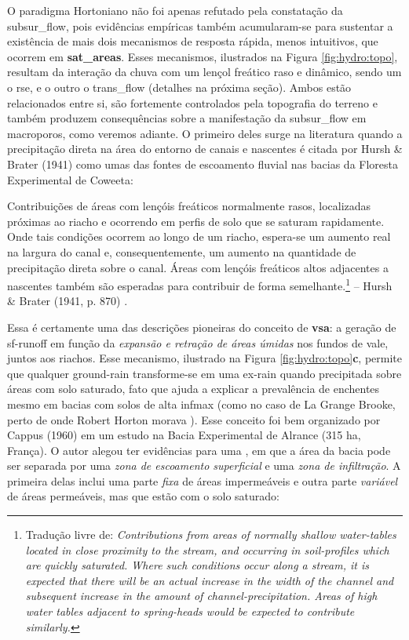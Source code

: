 \documentclass[./main.tex]{subfiles}
\begin{document}
\par O \gls{paradigma} Hortoniano não foi apenas refutado pela constatação da \gls{subsur_flow}, pois evidências empíricas também acumularam-se para sustentar a existência de mais dois mecanismos de resposta rápida, menos intuitivos, que ocorrem em \textbf{\gls{sat_areas}}. Esses mecanismos, ilustrados na Figura \ref{fig:hydro:topo}, resultam da interação da chuva com um lençol freático raso e dinâmico, sendo um o \gls{rse}, e o outro o \gls{trans_flow} (detalhes na próxima seção). Ambos estão relacionados entre si, são fortemente controlados pela topografia do terreno e também produzem consequências sobre a manifestação da \gls{subsur_flow} em macroporos, como veremos adiante. O primeiro deles surge na literatura quando a precipitação direta na área do entorno de canais e nascentes é citada por Hursh \& Brater (1941) \cite{Hursh1941} como umas das fontes de escoamento fluvial nas bacias da Floresta Experimental de Coweeta:   

\begin{adjustwidth}{100pt}{0pt}
\medskip
\small Contribuições de áreas com lençóis freáticos normalmente rasos, localizadas próximas ao riacho e ocorrendo em perfis de solo que se saturam rapidamente. Onde tais condições ocorrem ao longo de um riacho, espera-se um aumento real na largura do canal e, consequentemente, um aumento na quantidade de precipitação direta sobre o canal. Áreas com lençóis freáticos altos adjacentes a nascentes também são esperadas para contribuir de forma semelhante.\footnote{Tradução livre de: \textit{Contributions from areas of normally shallow water-tables located in close proximity to the stream, and occurring in soil-profiles which are quickly saturated. Where such conditions occur along a stream, it is expected that there will be an actual increase in the width of the channel and subsequent increase in the amount of channel-precipitation. Areas of high water tables adjacent to spring-heads would be expected to contribute similarly.}} -- Hursh \& Brater (1941, p. 870) \cite{Hursh1941}.
\medskip
\end{adjustwidth}

\noindent Essa é certamente uma das descrições pioneiras do conceito de \textbf{\gls{vsa}}: a geração de \gls{sf-runoff} em função da \textit{expansão e retração de áreas úmidas} nos fundos de vale, juntos aos riachos. Esse mecanismo, ilustrado na Figura \ref{fig:hydro:topo}\textbf{c}, permite que qualquer \gls{ground-rain} transforme-se em uma \gls{ex-rain} quando precipitada sobre áreas com solo saturado, fato que ajuda a explicar a prevalência de enchentes mesmo em bacias com solos de alta \gls{infmax} (como no caso de La Grange Brooke, perto de onde Robert Horton morava \cite{Beven2004c}). Esse conceito foi bem organizado por Cappus (1960) \cite{Cappus1960} em um estudo na Bacia Experimental de Alrance (315 ha, França). O autor alegou ter evidências para uma , em que a área da bacia pode ser separada por uma \textit{zona de escoamento superficial} e uma \textit{zona de infiltração}. A primeira delas inclui uma parte \textit{fixa} de áreas impermeáveis e outra parte \textit{variável} de áreas permeáveis, mas que estão com o solo saturado:
\end{document}
